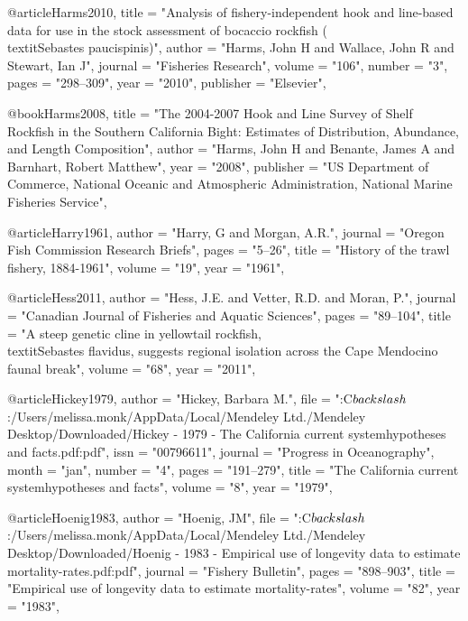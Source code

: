 @article{Harms2010,
    title = "{Analysis of fishery-independent hook and line-based data for use in the stock assessment of bocaccio rockfish (\\textit{{{Sebastes}} paucispinis})}",
    author = "{Harms, John H and Wallace, John R and Stewart, Ian J}",
    journal = "{Fisheries Research}",
    volume = "{106}",
    number = "{3}",
    pages = "{298--309}",
    year = "{2010}",
    publisher = "{Elsevier}",
}

@book{Harms2008,
    title = "{The 2004-2007 Hook and Line Survey of Shelf Rockfish in the Southern California Bight: Estimates of Distribution, Abundance, and Length Composition}",
    author = "{Harms, John H and Benante, James A and Barnhart, Robert Matthew}",
    year = "{2008}",
    publisher = "{US Department of Commerce, National Oceanic and Atmospheric Administration, National Marine Fisheries Service}",
}

@article{Harry1961,
    author = "{Harry, G and Morgan, A.R.}",
    journal = "{Oregon Fish Commission Research Briefs}",
    pages = "{5--26}",
    title = "{{History of the trawl fishery, 1884-1961}}",
    volume = "{19}",
    year = "{1961}",
}

@article{Hess2011,
    author = "{Hess, J.E. and Vetter, R.D. and Moran, P.}",
    journal = "{Canadian Journal of Fisheries and Aquatic Sciences}",
    pages = "{89--104}",
    title = "{{A steep genetic cline in yellowtail rockfish, \\textit{{Sebastes} flavidus}, suggests regional isolation across the Cape Mendocino faunal break}}",
    volume = "{68}",
    year = "{2011}",
}

@article{Hickey1979,
    author = "{Hickey, Barbara M.}",
    file = "{:C$\\backslash$:/Users/melissa.monk/AppData/Local/Mendeley Ltd./Mendeley Desktop/Downloaded/Hickey - 1979 - The California current systemhypotheses and facts.pdf:pdf}",
    issn = "{00796611}",
    journal = "{Progress in Oceanography}",
    month = "jan",
    number = "{4}",
    pages = "{191--279}",
    title = "{{The California current systemhypotheses and facts}}",
    volume = "{8}",
    year = "{1979}",
}

@article{Hoenig1983,
    author = "{Hoenig, JM}",
    file = "{:C$\\backslash$:/Users/melissa.monk/AppData/Local/Mendeley Ltd./Mendeley Desktop/Downloaded/Hoenig - 1983 - Empirical use of longevity data to estimate mortality-rates.pdf:pdf}",
    journal = "{Fishery Bulletin}",
    pages = "{898--903}",
    title = "{{Empirical use of longevity data to estimate mortality-rates}}",
    volume = "{82}",
    year = "{1983}",
}

